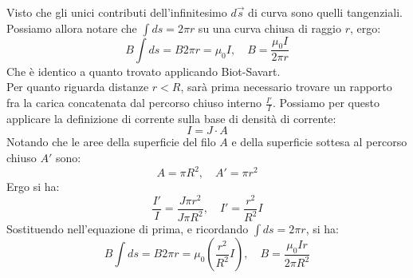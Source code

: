 \documentclass[a4paper,12pt]{article}
\begin{document}
Visto che gli unici contributi dell'infinitesimo $d\vec{s}$ di curva sono quelli tangenziali. Possiamo allora notare che $\int ds = 2\pi r$ su una curva chiusa di raggio $r$, ergo:
$$ B \int ds = B 2\pi r = \mu_0 I, \quad B = \frac{\mu_0 I}{2\pi r} $$
Che è identico a quanto trovato applicando Biot-Savart. \\
Per quanto riguarda distanze $r < R$, sarà prima necessario trovare un rapporto fra la carica concatenata dal percorso chiuso interno $\frac{I'}{I}$. Possiamo per questo applicare la definizione di corrente sulla base di densità
di corrente:
$$ I = J \cdot A $$
Notando che le aree della superficie del filo $A$ e della superficie sottesa al percorso chiuso $A'$ sono:
$$ A = \pi R^2, \quad A' = \pi r^2 $$
Ergo si ha:
$$ \frac{I'}{I} = \frac{J\pi r^2}{J\pi R^2}, \quad I' = \frac{r^2}{R^2}I $$
Sostituendo nell'equazione di prima, e ricordando $\int ds = 2\pi r$, si ha:
$$ B \int ds = B 2\pi r = \mu_0 \left( \frac{r^2}{R^2}I \right), \quad B = \frac{\mu_0 I r}{2\pi R^2} $$
\end{document}
